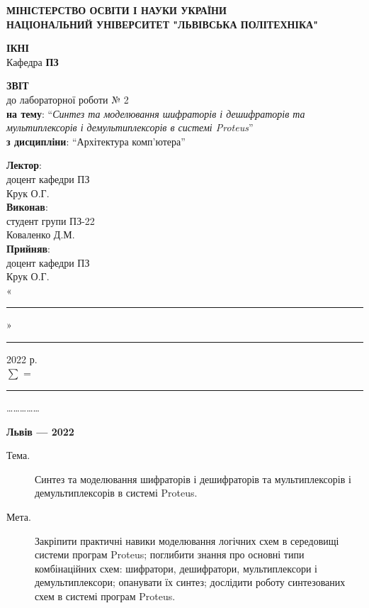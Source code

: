 \documentclass{article}
\newcommand\subject{Архітектура комп'ютера}
\newcommand\lecturer{доцент кафедри ПЗ\\Крук О.Г.}
\newcommand\teacher{доцент кафедри ПЗ\\Крук О.Г.}
\newcommand\mygroup{ПЗ-22}
\newcommand\lab{2}
\newcommand\theme{Синтез та моделювання шифраторів і дешифраторів та мультиплексорів і демультиплексорів в системі Proteus}
\newcommand\purpose{Закріпити практичні навики моделювання логічних схем в середовищі системи програм Proteus; поглибити знання про основні типи комбінаційних схем: шифратори, дешифратори, мультиплексори і демультиплексори; опанувати їх синтез; дослідити роботу синтезованих схем в системі програм Proteus}
\begin{document}
\begin{normalsize}
	\begin{titlepage}
		\thispagestyle{empty}
		\begin{center}
			\textbf{МІНІСТЕРСТВО ОСВІТИ І НАУКИ УКРАЇНИ\\
				НАЦІОНАЛЬНИЙ УНІВЕРСИТЕТ "ЛЬВІВСЬКА ПОЛІТЕХНІКА"}
		\end{center}
		\begin{flushright}
			\textbf{ІКНІ}\\
			Кафедра \textbf{ПЗ}
		\end{flushright}
		\vspace{200pt}
		\begin{center}
			\textbf{ЗВІТ}\\
			\vspace{10pt}
			до лабораторної роботи № \lab\\
			\textbf{на тему}: “\textit{\theme}”\\
			\textbf{з дисципліни}: “\subject”
		\end{center}
		\vspace{112pt}
		\begin{flushright}
			
			\textbf{Лектор}:\\
			\lecturer\\
			\vspace{28pt}
			\textbf{Виконав}:\\
			
			студент групи \mygroup\\
			Коваленко Д.М.\\
			\vspace{28pt}
			\textbf{Прийняв}:\\
			
			\teacher\\
			
			\vspace{28pt}
			«\rule{1cm}{0.15mm}» \rule{1.5cm}{0.15mm} 2022 р.\\
			$\sum$ = \rule{1cm}{0.15mm}……………\\
			
		\end{flushright}
		\vspace{\fill}
		\begin{center}
			\textbf{Львів — 2022}
		\end{center}
	\end{titlepage}
		
	\begin{description}
		\item[Тема.] \theme.
		\item[Мета.] \purpose.
	\end{description}


\end{normalsize}
\end{document}
